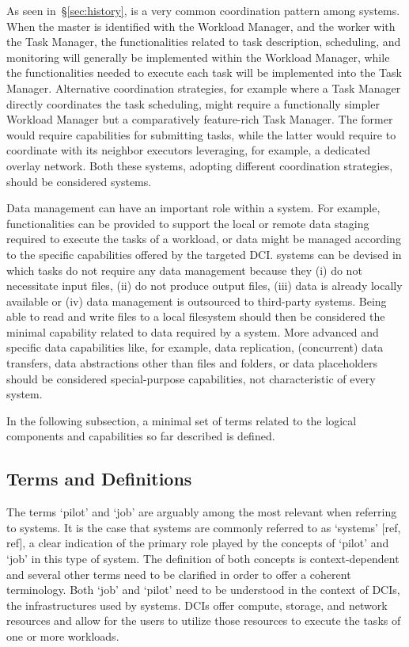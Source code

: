 \documentclass{sig-alternate}
\begin{document}
As seen in~\S\ref{sec:history}, \MW is a very common coordination pattern among
\pilot systems. When the master is identified with the Workload Manager, and
the worker with the Task Manager, the functionalities related to task
description, scheduling, and monitoring will generally be implemented within
the Workload Manager, while the functionalities needed to execute each task
will be implemented into the Task Manager. Alternative coordination
strategies, for example where a Task Manager directly coordinates the
task scheduling, might require a functionally simpler Workload Manager but a
comparatively feature-rich Task Manager. The former would require capabilities
for submitting tasks, while the latter would require to coordinate with its
neighbor executors leveraging, for example, a dedicated overlay network. Both
these systems, adopting different coordination strategies, should be considered
\pilot systems.

Data management can have an important role within a \pilot system. For example,
functionalities can be provided to support the local or remote data staging
required to execute the tasks of a workload, or data might be managed according
to the specific capabilities offered by the targeted DCI. \pilot systems can be
devised in which tasks do not require any data management because they (i) do
not necessitate input files, (ii) do not produce output files, (iii) data is
already locally available or (iv) data management is outsourced to third-party
systems. Being able to read and write files to a local filesystem should then
be considered the minimal capability related to data required by a \pilot
system. More advanced and specific data capabilities like, for example, data
replication, (concurrent) data transfers, data abstractions other than files
and folders, or data placeholders should be considered special-purpose
capabilities, not characteristic of every \pilot system.

In the following subsection, a minimal set of terms related to the
logical components and capabilities so far described is defined.

\subsection{Terms and Definitions}
\label{sec:termsdefs}

The terms `pilot' and `job' are arguably among the most relevant when referring
to \pilot systems. It is the case that \pilot systems are commonly referred to
as `\pilotjob systems' [ref, ref], a clear indication of the primary role
played by the concepts of `pilot' and `job' in this type of system. The
definition of both concepts is context-dependent and several other terms need
to be clarified in order to offer a coherent terminology. Both `job' and
`pilot' need to be understood in the context of DCIs, the infrastructures used
by \pilot systems. DCIs offer compute, storage, and network resources and
\pilots allow for the users to utilize those resources to execute the tasks of
one or more workloads.
\end{document}
